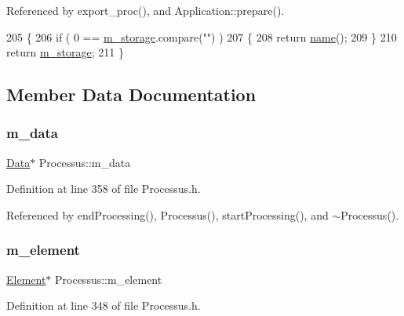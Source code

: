 Referenced by export\+\_\+proc(), and Application\+::prepare().


\begin{DoxyCode}
205                        \{
206     \textcolor{keywordflow}{if} ( 0 == \hyperlink{classProcessus_a132b1e71f72327e5a87f0a168c7b6325}{m\_storage}.compare(\textcolor{stringliteral}{""}) )
207     \{
208       \textcolor{keywordflow}{return} \hyperlink{classObject_a300f4c05dd468c7bb8b3c968868443c1}{name}();
209     \}
210     \textcolor{keywordflow}{return} \hyperlink{classProcessus_a132b1e71f72327e5a87f0a168c7b6325}{m\_storage};
211   \}
\end{DoxyCode}


\subsection{Member Data Documentation}
\mbox{\label{classProcessus_a3da9a9de8af54e2f47807a3e09dfccff}} 
\subsubsection{\texorpdfstring{m\+\_\+data}{m\_data}}
{\footnotesize\ttfamily \hyperlink{classData}{Data}$\ast$ Processus\+::m\+\_\+data\hspace{0.3cm}{\ttfamily [private]}}



Definition at line 358 of file Processus.\+h.



Referenced by end\+Processing(), Processus(), start\+Processing(), and $\sim$\+Processus().

\mbox{\label{classProcessus_aa9d24d53c3e52f36786cabb5d8e296e7}} 
\subsubsection{\texorpdfstring{m\+\_\+element}{m\_element}}
{\footnotesize\ttfamily \hyperlink{classElement}{Element}$\ast$ Processus\+::m\+\_\+element\hspace{0.3cm}{\ttfamily [protected]}}



Definition at line 348 of file Processus.\+h.



